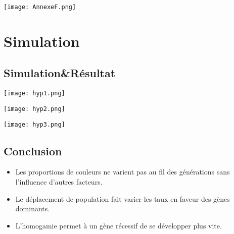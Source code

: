 \documentclass{beamer}
\begin{document}
\begin{frame}
\centering
\texttt{[image: AnnexeF.png]}  %
\end{frame}


\section{Simulation}
\subsection{Simulation\&Résultat}


\begin{frame}
\centering
\texttt{[image: hyp1.png]}
\end{frame}


\begin{frame}
\centering
\texttt{[image: hyp2.png]}
\end{frame}

\begin{frame}
\centering
\texttt{[image: hyp3.png]}
\end{frame}



\subsection{Conclusion}

\begin{frame}
\begin{block}{} 
\begin{itemize}
\item Les proportions de couleurs ne varient pas au fil des générations sans l'influence d'autres facteurs.
\item Le déplacement de population fait varier les taux en faveur des gènes dominants. 
\item L'homogamie permet à un gène récessif de se développer plus vite.
\end{itemize}
\end{block}
\end{frame}
\end{document}
